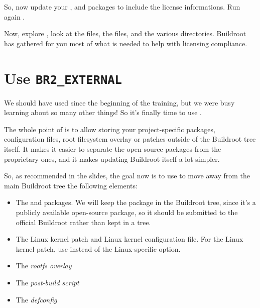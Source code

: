 So, now update your ,  and 
packages to include the license informations. Run again .

Now, explore , look at the  files,
the  files, and the various directories. Buildroot has
gathered for you most of what is needed to help with licensing
compliance.

\section{Use {\tt BR2\_EXTERNAL}}

We should have used  since the beginning of the
training, but we were busy learning about so many other things! So
it's finally time to use .

The whole point of  is to allow storing your
project-specific packages, configuration files, root filesystem
overlay or patches outside of the Buildroot tree itself. It makes it
easier to separate the open-source packages from the proprietary ones,
and it makes updating Buildroot itself a lot simpler.

So, as recommended in the slides, the goal now is to use
 to move away from the main Buildroot tree the
following elements:

\begin{itemize}

\item The  and  packages. We will keep the
   package in the Buildroot tree, since it's a
  publicly available open-source package, so it should be submitted to
  the official Buildroot rather than kept in a 
  tree.

\item The Linux kernel patch and Linux kernel configuration file. For
  the Linux kernel patch, use  instead of
  the Linux-specific  option.

\item The {\em rootfs overlay}

\item The {\em post-build script}

\item The {\em defconfig}

\end{itemize}

